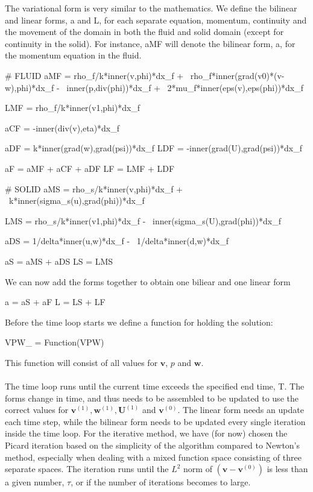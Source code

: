 The variational form is very similar to the mathematics. We define the bilinear and linear forms, a and L, for each separate equation, momentum, continuity and the movement of the domain in both the fluid and solid domain (except for continuity in the solid). For instance, aMF will denote the bilinear form, a, for the momentum equation in the fluid.
\begin{cverbatim}
# FLUID
aMF = rho_f/k*inner(v,phi)*dx_f + \
	rho_f*inner(grad(v0)*(v-w),phi)*dx_f - \
	 inner(p,div(phi))*dx_f + \
	2*mu_f*inner(eps(v),eps(phi))*dx_f

LMF = rho_f/k*inner(v1,phi)*dx_f

aCF = -inner(div(v),eta)*dx_f

aDF = k*inner(grad(w),grad(psi))*dx_f
LDF = -inner(grad(U),grad(psi))*dx_f

aF = aMF + aCF + aDF
LF = LMF + LDF

# SOLID
aMS = rho_s/k*inner(v,phi)*dx_f + \
	k*inner(sigma_s(u),grad(phi))*dx_f

LMS = rho_s/k*inner(v1,phi)*dx_f - \
	inner(sigma_s(U),grad(phi))*dx_f

aDS = 1/delta*inner(u,w)*dx_f - \
	1/delta*inner(d,w)*dx_f


aS = aMS + aDS
LS = LMS

\end{cverbatim}
We can now add the forms together to obtain one biliear and one linear form
\begin{cverbatim}
a = aS + aF 
L = LS + LF
\end{cverbatim}
Before the time loop starts we define a function for holding the solution:
\begin{cverbatim}
VPW_ = Function(VPW)
\end{cverbatim}
This function will consist of all values for $\mathbf{v}$, $p$ and $\mathbf{w}$.
\\
\\
The time loop runs until the current time exceeds the specified end time, T. The forms change in time, and thus needs to be assembled to be updated to use the correct values for $\mathbf{v}^{(1)}, \mathbf{w}^{(1)}, \mathbf{U}^{(1)}$ and $\mathbf{v}^{(0)}$. The linear form needs an update each time step, while the bilinear form needs to be updated every single iteration inside the time loop. For the iterative method, we have (for now) chosen the Picard iteration based on the simplicity of the algorithm compared to Newton's method, especially when dealing with a mixed function space consisting of three separate spaces. The iteration runs until the $L^2$ norm of $(\mathbf{v}-\mathbf{v}^{(0)})$ is less than a given number, $\tau$, or if the number of iterations becomes to large. 

